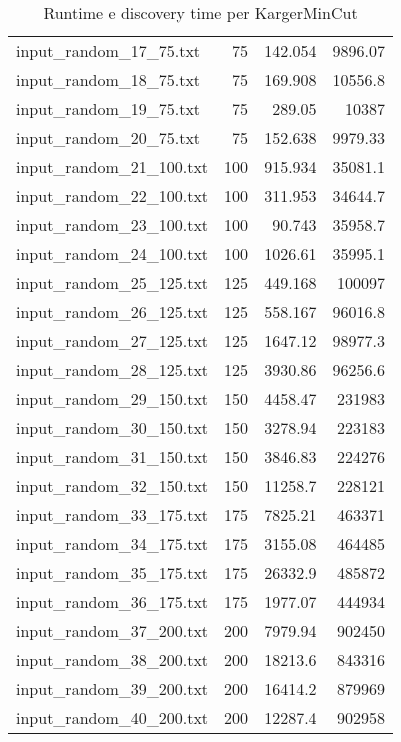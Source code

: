 \begin{table}[H]
\begin{tabular}{lrrr}
     input\_random\_17\_75.txt  &      75 &          142.054 &       9896.07  \\
     input\_random\_18\_75.txt  &      75 &          169.908 &      10556.8   \\
     input\_random\_19\_75.txt  &      75 &          289.05  &      10387     \\
     input\_random\_20\_75.txt  &      75 &          152.638 &       9979.33  \\
     input\_random\_21\_100.txt &     100 &          915.934 &      35081.1   \\
     input\_random\_22\_100.txt &     100 &          311.953 &      34644.7   \\
     input\_random\_23\_100.txt &     100 &           90.743 &      35958.7   \\
     input\_random\_24\_100.txt &     100 &         1026.61  &      35995.1   \\
     input\_random\_25\_125.txt &     125 &          449.168 &     100097     \\
     input\_random\_26\_125.txt &     125 &          558.167 &      96016.8   \\
     input\_random\_27\_125.txt &     125 &         1647.12  &      98977.3   \\
     input\_random\_28\_125.txt &     125 &         3930.86  &      96256.6   \\
     input\_random\_29\_150.txt &     150 &         4458.47  &     231983     \\
     input\_random\_30\_150.txt &     150 &         3278.94  &     223183     \\
     input\_random\_31\_150.txt &     150 &         3846.83  &     224276     \\
     input\_random\_32\_150.txt &     150 &        11258.7   &     228121     \\
     input\_random\_33\_175.txt &     175 &         7825.21  &     463371     \\
     input\_random\_34\_175.txt &     175 &         3155.08  &     464485     \\
     input\_random\_35\_175.txt &     175 &        26332.9   &     485872     \\
     input\_random\_36\_175.txt &     175 &         1977.07  &     444934     \\
     input\_random\_37\_200.txt &     200 &         7979.94  &     902450     \\
     input\_random\_38\_200.txt &     200 &        18213.6   &     843316     \\
     input\_random\_39\_200.txt &     200 &        16414.2   &     879969     \\
     input\_random\_40\_200.txt &     200 &        12287.4   &     902958     \\
     \hline
    \end{tabular}

    \caption{Runtime e discovery time per KargerMinCut}
    \label{table:karger-running-time}
\end{table}


